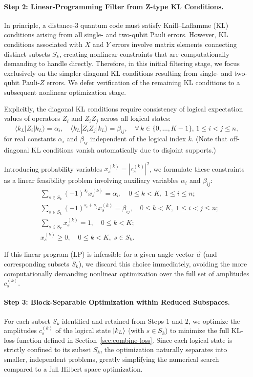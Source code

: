 \documentclass[8pt]{article}
\theoremstyle{definition}
\begin{document}
\paragraph{Step 2: Linear-Programming Filter from Z-type KL Conditions.}
In principle, a distance-3 quantum code must satisfy Knill–Laflamme (KL) conditions arising from all single- and two-qubit Pauli errors. However, KL conditions associated with $X$ and $Y$ errors involve matrix elements connecting distinct subsets $S_k$, creating nonlinear constraints that are computationally demanding to handle directly. Therefore, in this initial filtering stage, we focus exclusively on the simpler diagonal KL conditions resulting from single- and two-qubit Pauli-$Z$ errors. We defer verification of the remaining KL conditions to a subsequent nonlinear optimization stage.

Explicitly, the diagonal KL conditions require consistency of logical expectation values of operators $Z_i$ and $Z_iZ_j$ across all logical states:
\[
    \langle k_L|Z_i|k_L\rangle = \alpha_i,\quad \langle k_L|Z_iZ_j|k_L\rangle = \beta_{ij},\quad\forall\,k\in\{0,\dots,K-1\},\, 1\le i<j\le n,
\]
for real constants $\alpha_i$ and $\beta_{ij}$ independent of the logical index $k$. (Note that off-diagonal KL conditions vanish automatically due to disjoint supports.)

Introducing probability variables $x_s^{(k)} = |c_s^{(k)}|^2$, we formulate these constraints as a linear feasibility problem involving auxiliary variables $\alpha_i$ and $\beta_{ij}$:
\[
    \begin{aligned}
         & \sum_{s\in S_k}(-1)^{s_i} x_s^{(k)} = \alpha_i,\quad 0\le k < K,\; 1\le i \le n;         \\[4pt]
         & \sum_{s\in S_k}(-1)^{s_i+s_j} x_s^{(k)} = \beta_{ij},\quad 0\le k < K,\;1\le i < j\le n; \\[4pt]
         & \sum_{s\in S_k} x_s^{(k)} = 1,\quad 0\le k < K;                                          \\[4pt]
         & x_s^{(k)}\ge 0,\quad 0\le k < K,\; s\in S_k.
    \end{aligned}
\]

If this linear program (LP) is infeasible for a given angle vector $\vec{a}$ (and corresponding subsets $S_k$), we discard this choice immediately, avoiding the more computationally demanding nonlinear optimization over the full set of amplitudes $c_s^{(k)}$.

\paragraph{Step 3: Block-Separable Optimization within Reduced Subspaces.}
For each subset \( S_k \) identified and retained from Steps 1 and 2, we optimize the amplitudes \( c_s^{(k)} \) of the logical state \(\ket{k_L}\) (with \( s \in S_k \)) to minimize the full KL-loss function defined in Section~\ref{sec:combine-loss}. Since each logical state is strictly confined to its subset \( S_k \), the optimization naturally separates into smaller, independent problems, greatly simplifying the numerical search compared to a full Hilbert space optimization.
\end{document}

